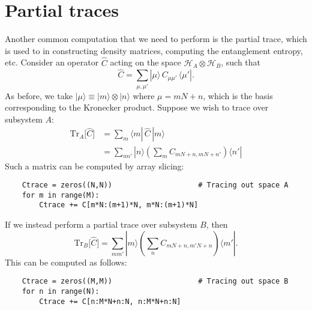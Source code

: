 \documentclass[pra,12pt]{revtex4}
\begin{document}
\section{Partial traces}

Another common computation that we need to perform is the partial
trace, which is used to in constructing density matrices, computing
the entanglement entropy, etc.  Consider an operator $\hat{C}$ acting
on the space $\mathscr{H}_A\otimes\mathscr{H}_B$, such that
$$\hat{C} = \sum_{\mu,\mu'} |\mu\rangle \, C_{\mu\mu'} \, \langle\mu'|.$$
As before, we take $|\mu\rangle \equiv |m\rangle\otimes|n\rangle$
where $\mu = mN+n$, which is the basis corresponding to the Kronecker
product.  Suppose we wish to trace over subsystem $A$:
$$\begin{aligned}\mathrm{Tr}_A \big[\hat{C}\big] &= \sum_m \langle m| \,\hat{C} \,|m\rangle \\ &= \sum_{nn'} |n\rangle \left(\sum_m C_{mN+n, mN+n'}\right) \langle n'| \end{aligned}$$
Such a matrix can be computed by array slicing:
\begin{verbatim}
    Ctrace = zeros((N,N))                    # Tracing out space A
    for m in range(M):
        Ctrace += C[m*N:(m+1)*N, m*N:(m+1)*N]
\end{verbatim}

If we instead perform a partial trace over subsystem $B$, then
$$\mathrm{Tr}_B \big[\hat{C}\big] = \sum_{mm'} |m\rangle \left(\sum_n C_{mN+n, m'N+n}\right) \langle m'|.$$
This can be computed as follows:
\begin{verbatim}
    Ctrace = zeros((M,M))                    # Tracing out space B
    for n in range(N):
        Ctrace += C[n:M*N+n:N, n:M*N+n:N]
\end{verbatim}
\end{document}
